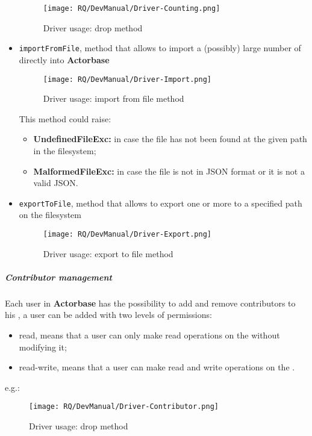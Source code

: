 \documentclass{scalatekids-article}
\begin{document}
\begin{itemize}
\begin{figure}[H]
\begin{center}
      \texttt{[image: RQ/DevManual/Driver-Counting.png]}
      \caption{Driver usage: drop method}
    \end{center}
  \end{figure}
\item \verb=importFromFile=, method that allows to import a (possibly) large number of 
  directly into \textbf{Actorbase}
  \begin{figure}[H]
    \begin{center}
      \texttt{[image: RQ/DevManual/Driver-Import.png]}
      \caption{Driver usage: import from file method}
    \end{center}
  \end{figure}
  This method could raise:
  \begin{itemize}
  \item \textbf{UndefinedFileExc:} in case the file has not been found at the given path in the filesystem;
  \item \textbf{MalformedFileExc:} in case the file is not in JSON format or it is not a valid JSON.
  \end{itemize}

\item \verb=exportToFile=, method that allows to export one or more  to a specified path on the filesystem
  \begin{figure}[H]
    \begin{center}
      \texttt{[image: RQ/DevManual/Driver-Export.png]}
      \caption{Driver usage: export to file method}
    \end{center}
  \end{figure}
\end{itemize}

\subparagraph{Contributor management}

Each user in \textbf{Actorbase} has the possibility to add and remove contributors
to his , a user can be added with two levels of permissions:
\begin{itemize}
\item read, means that a user can only make read operations on the  without modifying it;
\item read-write, means that a user can make read and write operations on the .
\end{itemize}
e.g.:
\begin{figure}[H]
  \begin{center}
    \texttt{[image: RQ/DevManual/Driver-Contributor.png]}
    \caption{Driver usage: drop method}
  \end{center}
\end{figure}
\end{document}
